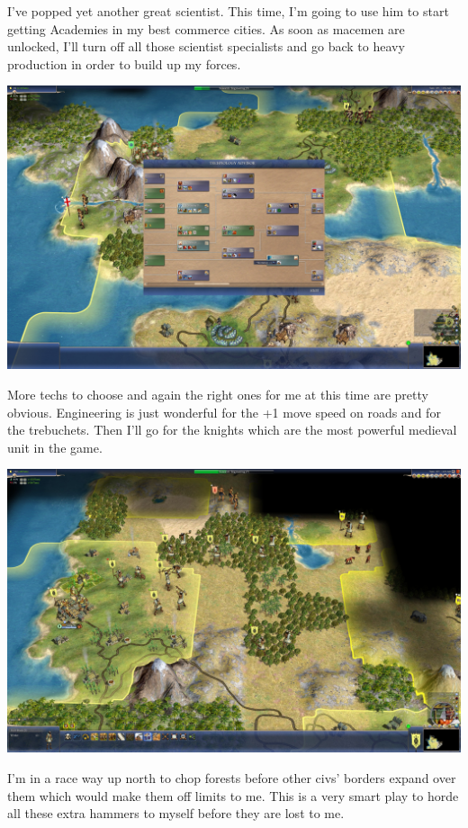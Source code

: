 \documentclass[10pt]{article}
\begin{document}
I've popped yet another great scientist. This time, I'm going to use him to start getting Academies in my best
commerce cities. As soon as macemen are unlocked, I'll turn off all those scientist specialists and go back to
heavy production in order to build up my forces.

\includegraphics[width=1.0\textwidth]{126}

More techs to choose and again the right ones for me at this time are pretty obvious. Engineering is just wonderful
for the +1 move speed on roads and for the trebuchets. Then I'll go for the knights which are the most powerful
medieval unit in the game.

\includegraphics[width=1.0\textwidth]{127}

I'm in a race way up north to chop forests before other civs' borders expand over them which would make them
off limits to me. This is a very smart play to horde all these extra hammers to myself before they are lost to me.
\end{document}
